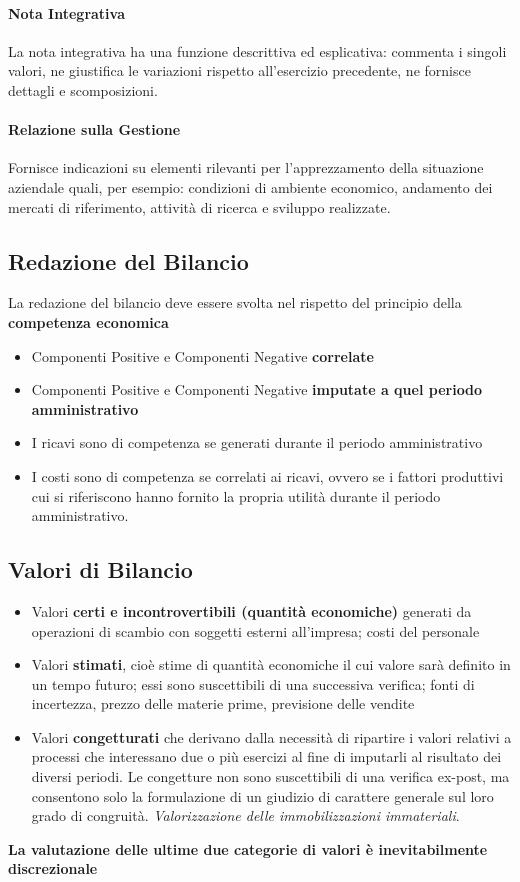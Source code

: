 \documentclass[12pt]{article}
\begin{document}
\paragraph{Nota Integrativa} La nota integrativa ha una funzione descrittiva ed esplicativa: commenta i singoli valori, ne giustifica le variazioni rispetto all’esercizio precedente, ne fornisce dettagli e scomposizioni.
\paragraph{Relazione sulla Gestione} Fornisce indicazioni su elementi rilevanti per l’apprezzamento della situazione aziendale quali, per esempio: condizioni di ambiente economico, andamento dei mercati di riferimento, attività di ricerca e sviluppo realizzate.
\subsection{Redazione del Bilancio}
La redazione del bilancio deve essere svolta nel rispetto del principio della \textbf{competenza economica}
\begin{itemize}
    \item Componenti Positive e Componenti Negative \textbf{correlate}
    \item Componenti Positive e Componenti Negative \textbf{imputate a quel periodo amministrativo}
    \item I ricavi sono di competenza se generati durante il periodo amministrativo
    \item I costi sono di competenza se correlati ai ricavi, ovvero se i fattori produttivi cui si riferiscono hanno fornito la propria utilità durante il periodo amministrativo.
\end{itemize}
\subsection{Valori di Bilancio}
\begin{itemize}
    \item Valori \textbf{certi e incontrovertibili (quantità economiche)} generati da operazioni di scambio con soggetti esterni all’impresa; costi del personale
    \item Valori \textbf{stimati}, cioè stime di quantità economiche il cui valore sarà definito in un tempo futuro; essi sono suscettibili di una successiva verifica; fonti di incertezza, prezzo delle materie prime, previsione delle vendite
    \item Valori \textbf{congetturati} che derivano dalla necessità di ripartire i valori relativi a processi che interessano due o più esercizi al fine di imputarli al risultato dei diversi periodi. Le congetture non sono suscettibili di una verifica ex-post, ma consentono solo la formulazione di un giudizio di carattere generale sul loro grado di congruità. \textit{Valorizzazione delle immobilizzazioni immateriali}.
\end{itemize}
\textbf{La valutazione delle ultime due categorie di valori è inevitabilmente discrezionale}
\end{document}
